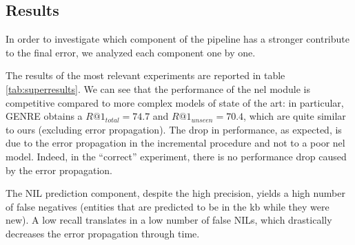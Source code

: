 \subsection{Results}
In order to investigate which component of the pipeline has a stronger contribute to the final error, we analyzed each component one by one.

The results of the most relevant experiments are reported in table \ref{tab:superresults}.
We can see that the performance of the \ac{nel} module is competitive compared to more complex models of state of the art: in particular, GENRE \cite{decao2021autoregressive} obtains a $R@1_{total} = 74.7$ and $R@1_{unseen} = 70.4$, which are quite similar to ours (excluding error propagation).
The drop in performance, as expected, is due to the error propagation in the incremental procedure and not to a poor \ac{nel} model. Indeed, in the ``correct'' experiment, there is no performance drop caused by the error propagation.

The NIL prediction component, despite the high precision, yields a high number of false negatives (entities that are predicted to be in the \ac{kb} while they were new).
A low recall translates in a low number of false NILs, which drastically decreases the error propagation through time.



